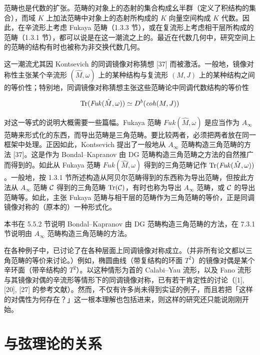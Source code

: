 范畴也是代数的扩张。范畴的对象上的态射的集合构成幺半群（定义了积结构的集合），而域 $K$ 上加法范畴中对象上的态射所构成的 $K$ 向量空间构成 $K$ 代数。因此，在辛流形上考虑 Fukaya 范畴（1.3.3 节），或在复流形上考虑相干层所构成的范畴（1.3.1 节），都可以说是在这一潮流之上的。最近在代数几何中，研究空间上的范畴的结构有时也被称为非交换代数几何。

这一潮流尤其因 Kontsevich 的同调镜像对称猜想 [37] 而被激活。一般地，镜像对称性主张某个辛流形 $(\hat{M},\omega)$ 上的某种结构与复流形 $(M,J)$ 上的某种结构之间的等价性；特别地，同调镜像对称猜想主张这些范畴论中同调代数结构的等价性

\[\operatorname{Tr}(\mathit{Fuk}(\hat{M},\omega))\simeq D^{b}(\mathit{coh}(M,J))\]

对这一等式的说明大概需要一些篇幅。Fukaya 范畴 $\mathit{Fuk}(\hat{M},\omega)$ 是应当作为 $A_\infty$ 范畴来形式化的东西，而导出范畴是三角范畴。要比较两者，必须把两者放在同一框架中处理。正因如此，Kontsevich 提出了一般地从 $A_\infty$ 范畴构造三角范畴的方法 [37]。这是作为 Bondal–Kapranov 由 DG 范畴构造三角范畴之方法的自然推广而得到的。如此从 Fukaya 范畴 $\mathit{Fuk}(\hat{M},\omega)$ 得到的三角范畴记作 $\operatorname{Tr}(\mathit{Fuk}(\hat{M},\omega))$。一般地，按 1.3.1 节所述构造从阿贝尔范畴得到的东西称为导出范畴，但按此方法从 $A_\infty$ 范畴 $\mathcal{C}$ 得到的三角范畴 $\operatorname{Tr}(\mathcal{C})$，有时也称为导出 $A_\infty$ 范畴，或 $\mathcal{C}$ 的导出范畴等。如此，主张 Fukaya 范畴与相干层的范畴作为三角范畴的等价，正是同调镜像对称的（原本的）一种形式化。


本书在 5.5.2 节说明 Bondal–Kapranov 由 DG 范畴构造三角范畴的方法，在 7.3.1 节说明由 $A_\infty$ 范畴构造三角范畴的方法。

在各种例子中，已讨论了在各种层面上同调镜像对称成立。（并非所有论文都以三角范畴的等价来讨论。）例如，椭圆曲线（带复结构的环面 $T^2$）的镜像对偶是某个辛环面（带辛结构的 $T^2$）。以这种情形为首的 Calabi–Yau 流形，以及 Fano 流形与其镜像对偶的辛流形等情形下的同调镜像对称，已有若干肯定性的讨论（[1], [20], [27] 的参考文献）。然而，不仅有许多尚未得到实证的例子，而且若把「这样的对偶性为何存在？」这一根本理解也包括进来，则这样的研究还只能说刚刚开始。

\section{与弦理论的关系}

